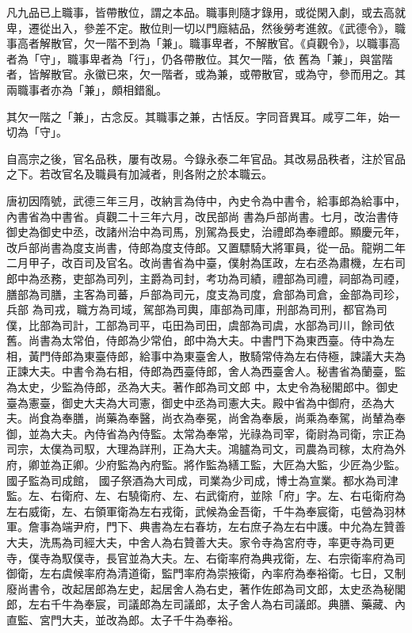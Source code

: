\begin{pinyinscope}
 凡九品已上職事，皆帶散位，謂之本品。職事則隨才錄用，或從閑入劇，或去高就卑，遷從出入，參差不定。散位則一切以門廕結品，然後勞考進敘。《武德令》，職事高者解散官，欠一階不到為「兼」。職事卑者，不解散官。《貞觀令》，以職事高者為「守」，職事卑者為「行」，仍各帶散位。其欠一階，依
 舊為「兼」，與當階者，皆解散官。永徽已來，欠一階者，或為兼，或帶散官，或為守，參而用之。其兩職事者亦為「兼」，頗相錯亂。



 其欠一階之「兼」，古念反。其職事之兼，古恬反。字同音異耳。咸亨二年，始一切為「守」。



 自高宗之後，官名品秩，屢有改易。今錄永泰二年官品。其改易品秩者，注於官品之下。若改官名及職員有加減者，則各附之於本職云。



 唐初因隋號，武德三年三月，改納言為侍中，內史令為中書令，給事郎為給事中，內書省為中書省。貞觀二十三年六月，改民部尚
 書為戶部尚書。七月，改治書侍御史為御史中丞，改諸州治中為司馬，別駕為長史，治禮郎為奉禮郎。顯慶元年，改戶部尚書為度支尚書，侍郎為度支侍郎。又置驃騎大將軍員，從一品。龍朔二年二月甲子，改百司及官名。改尚書省為中臺，僕射為匡政，左右丞為肅機，左右司郎中為丞務，吏部為司列，主爵為司封，考功為司績，禮部為司禮，祠部為司禋，膳部為司膳，主客為司蕃，戶部為司元，度支為司度，倉部為司倉，金部為司珍，兵部
 為司戎，職方為司域，駕部為司輿，庫部為司庫，刑部為司刑，都官為司僕，比部為司計，工部為司平，屯田為司田，虞部為司虞，水部為司川，餘司依舊。尚書為太常伯，侍郎為少常伯，郎中為大夫。中書門下為東西臺。侍中為左相，黃門侍郎為東臺侍郎，給事中為東臺舍人，散騎常侍為左右侍極，諫議大夫為正諫大夫。中書令為右相，侍郎為西臺侍郎，舍人為西臺舍人。秘書省為蘭臺，監為太史，少監為侍郎，丞為大夫。著作郎為司文郎
 中，太史令為秘閣郎中。御史臺為憲臺，御史大夫為大司憲，御史中丞為司憲大夫。殿中省為中御府，丞為大夫。尚食為奉膳，尚藥為奉醫，尚衣為奉冕，尚舍為奉扆，尚乘為奉駕，尚輦為奉御，並為大夫。內侍省為內侍監。太常為奉常，光祿為司宰，衛尉為司衛，宗正為司宗，太僕為司馭，大理為詳刑，正為大夫。鴻臚為司文，司農為司稼，太府為外府，卿並為正卿。少府監為內府監。將作監為繕工監，大匠為大監，少匠為少監。國子監為司成館，
 國子祭酒為大司成，司業為少司成，博士為宣業。都水為司津監。左、右衛府、左、右驍衛府、左、右武衛府，並除「府」字。左、右屯衛府為左右威衛，左、右領軍衛為左右戎衛，武候為金吾衛，千牛為奉宸衛，屯營為羽林軍。詹事為端尹府，門下、典書為左右春坊，左右庶子為左右中護。中允為左贊善大夫，洗馬為司經大夫，中舍人為右贊善大夫。家令寺為宮府寺，率更寺為司更寺，僕寺為馭僕寺，長官並為大夫。左、右衛率府為典戎衛，左、右宗衛率府為司
 御衛，左右虞候率府為清道衛，監門率府為崇掖衛，內率府為奉裕衛。七日，又制廢尚書令，改起居郎為左史，起居舍人為右史，著作佐郎為司文郎，太史丞為秘閣郎，左右千牛為奉宸，司議郎為左司議郎，太子舍人為右司議郎。典膳、藥藏、內直監、宮門大夫，並改為郎。太子千牛為奉裕。




\end{pinyinscope}

